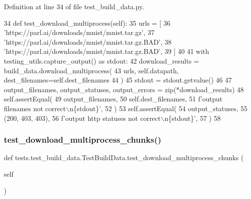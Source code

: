 Definition at line 34 of file test\+\_\+build\+\_\+data.\+py.


\begin{DoxyCode}
34     \textcolor{keyword}{def }test\_download\_multiprocess(self):
35         urls = [
36             \textcolor{stringliteral}{'https://parl.ai/downloads/mnist/mnist.tar.gz'},
37             \textcolor{stringliteral}{'https://parl.ai/downloads/mnist/mnist.tar.gz.BAD'},
38             \textcolor{stringliteral}{'https://parl.ai/downloads/mnist/mnist.tar.gz.BAD'},
39         ]
40 
41         with testing\_utils.capture\_output() \textcolor{keyword}{as} stdout:
42             download\_results = build\_data.download\_multiprocess(
43                 urls, self.datapath, dest\_filenames=self.dest\_filenames
44             )
45         stdout = stdout.getvalue()
46 
47         output\_filenames, output\_statuses, output\_errors = zip(*download\_results)
48         self.assertEqual(
49             output\_filenames,
50             self.dest\_filenames,
51             f\textcolor{stringliteral}{'output filenames not correct\(\backslash\)n\{stdout\}'},
52         )
53         self.assertEqual(
54             output\_statuses,
55             (200, 403, 403),
56             f\textcolor{stringliteral}{'output http statuses not correct\(\backslash\)n\{stdout\}'},
57         )
58 
\end{DoxyCode}
\mbox{\label{classtests_1_1test__build__data_1_1TestBuildData_a57a7d34acf8cec7b757605c5659b6e96}} 
\subsubsection{\texorpdfstring{test\+\_\+download\+\_\+multiprocess\+\_\+chunks()}{test\_download\_multiprocess\_chunks()}}
{\footnotesize\ttfamily def tests.\+test\+\_\+build\+\_\+data.\+Test\+Build\+Data.\+test\+\_\+download\+\_\+multiprocess\+\_\+chunks (\begin{DoxyParamCaption}\item[{}]{self }\end{DoxyParamCaption})}



